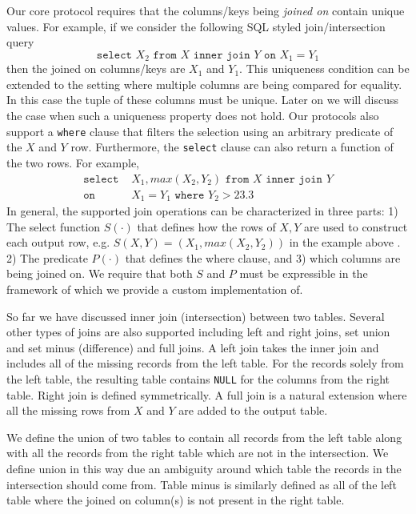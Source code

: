 \fi
Our core protocol requires that the columns/keys being \emph{joined on} contain unique values. For example, if we consider the following SQL styled join/intersection query
$$
\texttt{select } X_2 \texttt{ from } X \texttt{ inner join } Y \texttt{ on } X_1 = Y_1
$$
then the joined on columns/keys are $X_1$ and $Y_1$. This uniqueness condition can be extended to the setting where multiple columns are being compared for equality. 
\iffullversion
In this case the tuple of these columns must be unique. 
\fi
Later on we will discuss the case when such a uniqueness property does not hold. Our protocols also support a \texttt{where} clause that filters the selection using an arbitrary predicate of the $X$ and $Y$ row. Furthermore, the \texttt{select} clause can also return a function of the two rows. For example,
\begin{align*}
\texttt{select }&  X_1,max(X_2, Y_2)  \texttt{ from } X \texttt{ inner join } Y \\
\texttt{on }& X_1 = Y_1 \texttt{ where } Y_2 > 23.3
\end{align*}
In general, the supported join operations can be characterized in three parts: 1) The select function $S(\cdot)$ that defines how the rows of $X,Y$ are used to construct each output row, e.g. $S(X,Y)=(X_1, max(X_2,Y_2))$
\iffullversion
in the example above
\fi. 2) The predicate $P(\cdot)$ that defines the where clause, and 3) which columns are being joined on.
\iffullversion
 We require that both $S$ and $P$ must be expressible in the framework of \cite{aby3} which we provide a custom implementation of.
\fi

\iffullversion
So far we have discussed inner join (intersection) between two tables. 
\fi
Several other types of joins are also supported including left and right joins, set union and set minus (difference) and full joins. A left join takes the inner join and includes all of the missing records from the left table. For the records solely from the left table, the resulting table contains \texttt{NULL} for the columns from the right table. Right join is defined symmetrically. A full join is a natural extension where all the missing rows from $X$ and $Y$ are added to the output table.

We define the union of two tables to contain all records from the left table along with all the records from the right table which are not in the intersection. We define union in this way due an ambiguity around which table the records in the intersection should come from. Table minus is similarly defined as all of the left table where the joined on column(s) is not present in the right table. 

